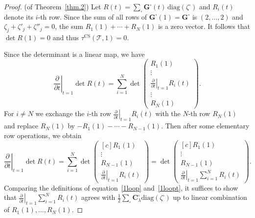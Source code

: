 \documentclass[12pt,reqno]{amsart}
\theoremstyle{definition}
\def\calT{\mathcal T}
\def\be{\begin{equation}}
\def\ee{\end{equation}}
\def\CS{\mathrm{CS}}
\def\diag{\mathrm{diag}}
\begin{document}
\begin{proof}(of Theorem~\ref{thm.2})
Let $R(t) = \sum_{\square} \mathbf{G}^\square (t)\, \mathrm{diag}(\zeta^\square)$ and
$R_i(t)$ denote its $i$-th row. Since the sum of all rows of  $\mathbf{G}^\square(1) =
\mathbf{G}^\square$ is $(2,\ldots,2)$ and
$\zeta_j + \zeta'_j+ \zeta''_j =0$, the sum $R_1(1)+\cdots+R_N(1)$ is
a zero vector. It follows that $\det R(1)=0$ and thus $\tau^{\CS}(\calT,1)=0$.	

Since the determinant is a linear map, we have
\be
\left. \frac{\partial}{\partial t} \right |_{t=1} \det R(t) 
= \sum_{i=1}^{N} \det
\begin{pmatrix}
R_1(1) \\
\vdots \\
\left.\frac{\partial}{\partial t}\right |_{t=1} R_i(t) \\
\vdots \\
R_N(1)
\end{pmatrix}  .
\ee	
For $i \neq N$ we exchange the $i$-th row
$\left.\frac{\partial}{\partial t} \right |_{t=1} R_i(t)$ with the $N$-th row
$R_N(1)$  and replace $R_N(1)$ by $-R_1(1)-\cdots-R_{N-1}(1)$. Then after some
elementary row operations, we obtain
\be
\left. \frac{\partial}{\partial t} \right |_{t=1} \det R(t) 
=\sum_{i=1}^N \det
\begin{pmatrix*}[c]
R_1(1) \\
\vdots \\
R_{N-1}(1) \\
\left.\frac{\partial}{\partial t}\right |_{t=1} R_i(t)
\end{pmatrix*}
= \det
\begin{pmatrix*}[c]
R_1(1) \\
\vdots \\
R_{N-1}(1) \\
 \left.\frac{\partial}{\partial t}\right |_{t=1} \sum_{i=1}^N R_i(t)
\end{pmatrix*}  .
\ee		
Comparing the definitions of equation~\eqref{1loop} and~\eqref{1loopt}, it
suffices to show that $\left.\frac{\partial}{\partial t}\right
|_{t=1} \sum_{i=1}^N R_i(t)$ agrees with
$\frac{1}{2}\sum_\square \mathbf{C}_\lambda^\square  \diag(\zeta^\square)$ up to
linear combination of $R_1(1),\ldots, R_{N}(1)$. 


\end{proof}
\end{document}
